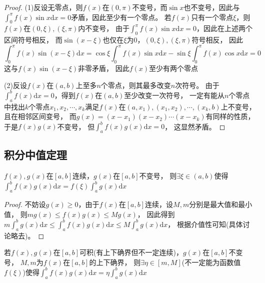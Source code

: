 \begin{proof}
  (1)反设无零点，则$f(x)$在$(0,\pi)$不变号，而$\sin x$也不变号，因此与$\int_0^{\pi} f(x) \sin x\mathrm{d} x = 0$矛盾，因此至少有一个零点。
  若$f(x)$只有一个零点$\xi$，则$f(x)$在$(0,\xi), (\xi,\pi)$内不变号，
  由于$\int_0^{\pi} f(x) \sin x \mathrm{d} x= 0$，因此在上述两个区间符号相反，
  而$\sin(x - \xi)$也仅在$\xi$为$0$，$(0,\xi),(\xi,\pi)$符号相反，
  因此
  \begin{equation*}
    \int_0^{\pi} f(x) \sin(x - \xi)\mathrm{d} x = \cos \xi \int_0^{\pi}f(x) \sin x \mathrm{d} x - \sin \xi \int _0^{\pi} f(x) \cos x \mathrm{d} x = 0
  \end{equation*}
  这与$f(x)\sin(x - \xi)$非零矛盾，
  因此$f(x)$至少有两个零点

  (2)反设$f(x)$在$(a,b)$上至多$n$个零点，则其最多改变$n$次符号。
  由于$\int_a^b f(x)\mathrm{d}x = 0$，得到$f(x)$在$(a,b)$至少改变一次符号，
  一定有能从$n$个零点中找出$k$个零点$x_1,x_2,\cdots,x_k$满足$f(x)$在$(a,x_1),(x_1,x_2),\cdots,(x_k,b)$上不变号，
  且在相邻区间变号，
  而$g(x) = (x-x_1)(x-x_2)\cdots(x-x_k)$有同样的性质，
  于是$f(x)g(x)$不变号，
  但$\int _a^b f(x)g(x) \mathrm{d} x = 0$，
  这显然矛盾。
\end{proof}


\subsection{积分中值定理}

\begin{theorem}[积分第一中值定理]
  $f(x),g(x)$在$[a,b]$连续，$g(x)$在$[a,b]$不变号，
  则$\exists \xi \in (a,b)$使得$\int_a^b f(x)g(x)\mathrm{d}x = f(\xi) \int_a^b g(x)\mathrm{d}x$
\end{theorem}

\begin{proof}
  不妨设$g(x) \geq 0$，由于$f(x)$在$[a,b]$连续，设$M,m$分别是最大值和最小值，
  则$mg(x) \leq f(x) g(x) \leq M g(x)$，
  因此得到$m \int_a^b g(x)\mathrm{d}x \leq \int_a^b f(x)g(x) \mathrm{d}x \leq M \int_a^b g(x)\mathrm{d}x$，
  根据介值性可知(具体讨论略去)。
\end{proof}

\begin{corollary}[第一中值定理的推广]
  若$f(x),g(x)$在$[a,b]$可积(有上下确界但不一定连续)，$g(x)$在$[a,b]$不变号，
  $M,m$为$f(x)$在$[a,b]$的上下确界，
  则$\exists \eta \in [m,M]$(不一定能为函数值$f(\xi)$)使得$\int_a^b f(x)g(x) \mathrm{d}x = \eta \int_a^b g(x)\mathrm{d}x$
\end{corollary}

